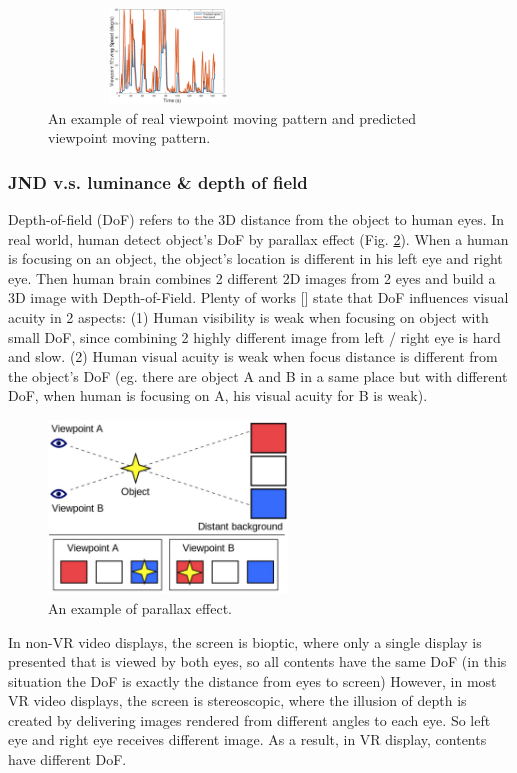 \begin{figure}
  \centering
  \includegraphics[width=2.5in, height=1in]{images/speed_analysis.eps}
  \caption{An example of real viewpoint moving pattern and predicted viewpoint moving pattern.}
  \label{v-aconflict}
  \end{figure}

\subsubsection{JND v.s. luminance \& depth of field}

Depth-of-field (DoF) refers to the 3D distance from the object to human eyes. In real world, human detect object's DoF by parallax effect (Fig. \ref{v-aconflict}). When a human is focusing on an object, the object's location is different in his left eye and right eye. Then human brain combines 2 different 2D images from 2 eyes and build a 3D image with Depth-of-Field. Plenty of works [] state that DoF influences visual acuity in 2 aspects: (1) Human visibility is weak when focusing on object with small DoF, since combining 2 highly different image from left / right eye is hard and slow. (2) Human visual acuity is weak when focus distance is different from the object's DoF (eg. there are object A and B in a same place but with different DoF, when human is focusing on A, his visual acuity for B is weak).

\begin{figure}
  \centering
  \includegraphics[width=2.5in]{images/ver-acc.jpg}
  \caption{An example of parallax effect.}
  \label{v-aconflict}
  \end{figure}

In non-VR video displays, the screen is bioptic, where only a single display is presented that is viewed by both eyes, so all contents have the same DoF (in this situation the DoF is exactly the distance from eyes to screen) However, in most VR video displays, the screen is stereoscopic, where the illusion of depth is created by delivering images rendered from different angles to each eye. So left eye and right eye receives different image. As a result, in VR display, contents have different DoF.

